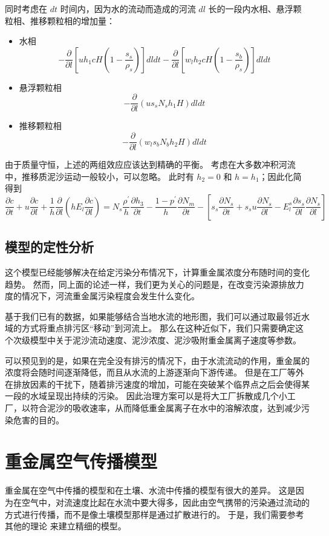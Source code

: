 \documentclass[a4paper]{article}
\begin{document}
同时考虑在 $dt$ 时间内，因为水的流动而造成的河流 $dl$ 长的一段内水相、悬浮颗粒相、推移颗粒相的增加量：
\begin{itemize}
	\item 水相
		$$ -\frac{\partial}{\partial l}\left[uh_1cH\left(1-\frac{s_s}{\rho_s}\right)\right]dldt -\frac{\partial}{\partial l}\left[w_lh_2cH\left(1-\frac{s_b}{\rho_s}\right)\right]dldt $$
	\item 悬浮颗粒相
		$$ -\frac{\partial}{\partial l}(us_sN_sh_1H)dldt $$
	\item 推移颗粒相
		$$ -\frac{\partial}{\partial l}(w_ls_bN_bh_2H)dldt $$
\end{itemize}

由于质量守恒，上述的两组效应应该达到精确的平衡。
考虑在大多数冲积河流中，推移质泥沙运动一般较小，可以忽略。
此时有 $h_2 = 0$ 和 $h = h_1$；因此化简得到
$$ \frac{\partial c}{\partial t} + u\frac{\partial c}{\partial l} + \frac{1}{h} \frac{\partial}{\partial l}\left(h E_l \frac{\partial c}{\partial l}\right) = N_s \frac{\rho^{'}}{h} \frac{\partial h_3}{\partial t} - \frac{1 - p^{'}}{h}\frac{\partial N_m}{\partial t} - \left[ s_s\frac{\partial N_s}{\partial t} + s_s u \frac{\partial N_s}{\partial l} -E_l^s\frac{\partial s_s}{\partial l}\frac{\partial N_s}{\partial l} \right]$$

\subsection{模型的定性分析}
这个模型已经能够解决在给定污染分布情况下，计算重金属浓度分布随时间的变化趋势。
然而，同上面的论述一样，我们更为关心的问题是，在改变污染源排放力度的情况下，河流重金属污染程度会发生什么变化。

基于我们已有的数据，如果能够结合当地水流的地形图，我们可以通过取最邻近水域的方式将重点排污区“移动”到河流上。
那么在这种近似下，我们只需要确定这个次级模型中关于泥沙流动速度、泥沙浓度、泥沙吸附重金属离子速度等参数。

可以预见到的是，如果在完全没有排污的情况下，由于水流流动的作用，重金属的浓度将会随时间逐渐降低，而且从水流的上游逐渐向下游传递。
但是在工厂等外在排放因素的干扰下，随着排污速度的增加，可能在突破某个临界点之后会使得某一段的水域呈现出持续的污染。
因此治理方案可以是将大工厂拆散成几个小工厂，以符合泥沙的吸收速率，从而降低重金属离子在水中的溶解浓度，达到减少污染危害的目的。

\section{重金属空气传播模型}
重金属在空气中传播的模型和在土壤、水流中传播的模型有很大的差异。
这是因为在空气中，对流速度比起在水流中要大得多，因此由空气携带的污染通过流动的方式进行传播，而不是像土壤模型那样是通过扩散进行的。
于是，我们需要参考其他的理论 \cite{air_model} 来建立精细的模型。
\end{document}
